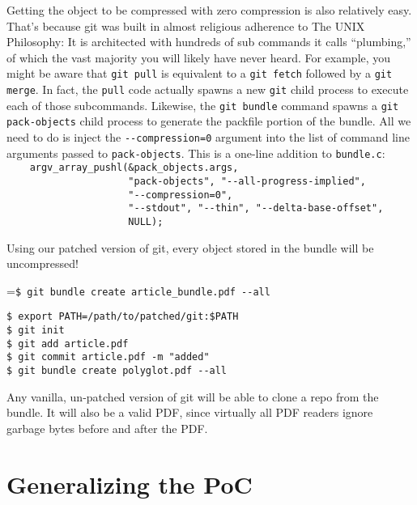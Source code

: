 \documentclass{article}
\begin{document}
Getting the object to be compressed with zero compression is also
relatively easy.  That's because git was built in almost religious
adherence to The UNIX Philosophy: It is architected with hundreds of
sub commands it calls ``plumbing,'' of which the vast majority you
will likely have never heard. For example, you might be aware
that \texttt{git pull} is equivalent to a \texttt{git fetch} followed
by a \texttt{git merge}. In fact, the \texttt{pull} code actually
spawns a new \texttt{git} child process to execute each of those
subcommands. Likewise, the \texttt{git bundle} command spawns
a \texttt{git pack-objects} child process to generate the packfile
portion of the bundle.  All we need to do is inject
the \texttt{-\relax-compression=0} argument into the list of command line
arguments passed to \texttt{pack-objects}.  This is a one-line
addition to \texttt{bundle.c}:\\ {\footnotesize {\color{gray}
\verb|    argv_array_pushl(&pack_objects.args,|\\
\verb|                     "pack-objects", "--all-progress-implied",|}\\
\verb|                     "--compression=0",|\\
{\color{gray}
\verb|                     "--stdout", "--thin", "--delta-base-offset",|\\
\verb|                     NULL);|
}}

Using our patched version of git, every object stored in the bundle
will be uncompressed!
\begin{center}
\begingroup
{}=\hbox{\footnotesize\verb|$ git bundle create article_bundle.pdf --all|}
\begin{minipage}{\wd9}
\footnotesize\begin{verbatim}
$ export PATH=/path/to/patched/git:$PATH
$ git init
$ git add article.pdf
$ git commit article.pdf -m "added"
$ git bundle create polyglot.pdf --all
\end{verbatim}
\end{minipage}
\endgroup
\end{center}
Any vanilla, un-patched version of git will be able to clone a repo
from the bundle. It will also be a valid PDF, since virtually all
PDF readers ignore garbage bytes before and after the PDF.

\section{Generalizing the PoC}
\end{document}
